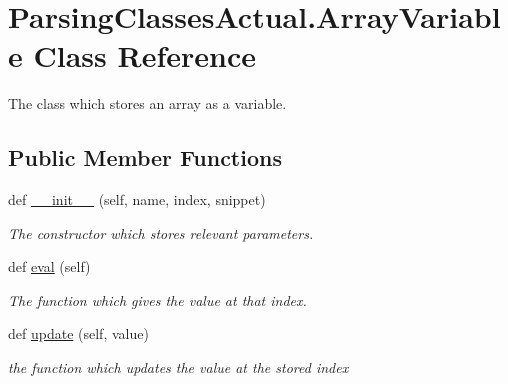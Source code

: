 \hypertarget{class_parsing_classes_actual_1_1_array_variable}{}\section{Parsing\+Classes\+Actual.\+Array\+Variable Class Reference}
\label{class_parsing_classes_actual_1_1_array_variable}


The class which stores an array as a variable.  


\subsection*{Public Member Functions}
\begin{DoxyCompactItemize}
\item 
def \hyperlink{class_parsing_classes_actual_1_1_array_variable_a8d1f844a7bd0c87083039e7d40c5d882}{\+\_\+\+\_\+init\+\_\+\+\_\+} (self, name, index, snippet)
\begin{DoxyCompactList}\small\item\em The constructor which stores relevant parameters. \end{DoxyCompactList}\item 
def \hyperlink{class_parsing_classes_actual_1_1_array_variable_a1e14b4cc90b00fca48dbf6e9dcf58628}{eval} (self)\hypertarget{class_parsing_classes_actual_1_1_array_variable_a1e14b4cc90b00fca48dbf6e9dcf58628}{}\label{class_parsing_classes_actual_1_1_array_variable_a1e14b4cc90b00fca48dbf6e9dcf58628}

\begin{DoxyCompactList}\small\item\em The function which gives the value at that index. \end{DoxyCompactList}\item 
def \hyperlink{class_parsing_classes_actual_1_1_array_variable_adb73630679e22d44052196d2135b55bc}{update} (self, value)
\begin{DoxyCompactList}\small\item\em the function which updates the value at the stored index \end{DoxyCompactList}\end{DoxyCompactItemize}
